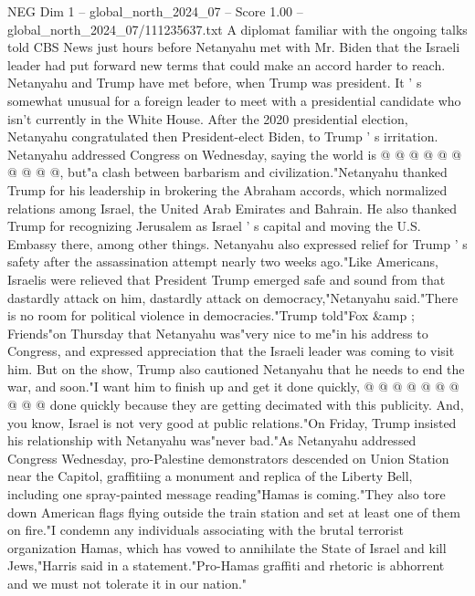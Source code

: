 \begin{textsample}{NEG Dim 1 – global\_north\_2024\_07 – Score 1.00 – global\_north\_2024\_07/111235637.txt}
A diplomat familiar with the ongoing talks told CBS News just hours before Netanyahu met with Mr.
Biden that the Israeli leader had put forward new terms that could make an accord harder to reach.
Netanyahu and Trump have met before, when Trump was president.
It ' s somewhat unusual for a foreign leader to meet with a presidential candidate who isn't currently in the White House.
After the 2020 presidential election, Netanyahu congratulated then President-elect Biden, to Trump ' s irritation.
Netanyahu addressed Congress on Wednesday, saying the world is @ @ @ @ @ @ @ @ @ @, but"a clash between barbarism and civilization."Netanyahu thanked Trump for his leadership in brokering the Abraham accords, which normalized relations among Israel, the United Arab Emirates and Bahrain.
He also thanked Trump for recognizing Jerusalem as Israel ' s capital and moving the U.S.
Embassy there, among other things.
Netanyahu also expressed relief for Trump ' s safety after the assassination attempt nearly two weeks ago."Like Americans, Israelis were relieved that President Trump emerged safe and sound from that dastardly attack on him, dastardly attack on democracy,"Netanyahu said."There is no room for political violence in democracies."Trump told"Fox \&amp ; Friends"on Thursday that Netanyahu was"very nice to me"in his address to Congress, and expressed appreciation that the Israeli leader was coming to visit him.
But on the show, Trump also cautioned Netanyahu that he needs to end the war, and soon."I want him to finish up and get it done quickly, @ @ @ @ @ @ @ @ @ @ done quickly because they are getting decimated with this publicity.
And, you know, Israel is not very good at public relations."On Friday, Trump insisted his relationship with Netanyahu was"never bad."As Netanyahu addressed Congress Wednesday, pro-Palestine demonstrators descended on Union Station near the Capitol, graffitiing a monument and replica of the Liberty Bell, including one spray-painted message reading"Hamas is coming."They also tore down American flags flying outside the train station and set at least one of them on fire."I condemn any individuals associating with the brutal terrorist organization Hamas, which has vowed to annihilate the State of Israel and kill Jews,"Harris said in a statement."Pro-Hamas graffiti and rhetoric is abhorrent and we must not tolerate it in our nation."

\end{textsample}
